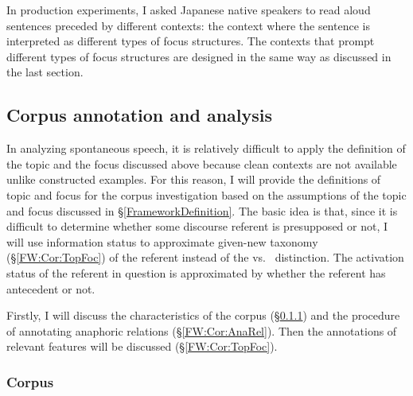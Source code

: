 In production experiments,
I asked Japanese native speakers to read aloud sentences preceded by different contexts:
the context where the sentence is interpreted as different types of focus structures.
The contexts that prompt different types of focus structures
are designed in the same way as discussed in the last section.

\subsection{Corpus annotation and analysis}\label{FrameworkCorpus}

In analyzing spontaneous speech,
it is relatively difficult to apply the definition of the topic and the focus discussed above
because clean contexts are not available unlike constructed examples.
For this reason,
I will provide the definitions of topic and focus for the corpus investigation
based on the assumptions of the topic and focus discussed in \S \ref{FrameworkDefinition}.
The basic idea is that, since it is difficult to determine
whether some discourse referent is presupposed or not,
I will use information status to approximate given-new taxonomy (\S \ref{FW:Cor:TopFoc})
of the referent
instead of the  vs.\  distinction.
The activation status of the referent in question is approximated
by whether the referent has antecedent or not.

Firstly, I will discuss the characteristics of the corpus (\S \ref{FW:Cor:Cor})
and the procedure of annotating anaphoric relations (\S \ref{FW:Cor:AnaRel}).
Then the annotations of relevant features will be discussed (\S \ref{FW:Cor:TopFoc}).

\subsubsection{Corpus}\label{FW:Cor:Cor}

